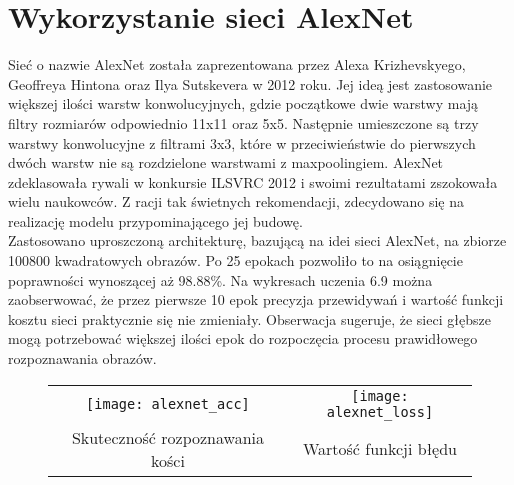 \section{Wykorzystanie sieci AlexNet}
Sieć o nazwie AlexNet \cite{AlexNetNVIDIA, AlexNetdesc, AlexNetpresentation} została
zaprezentowana przez Alexa Krizhevskyego, Geoffreya Hintona oraz Ilya Sutskevera w 2012 roku.
Jej ideą jest zastosowanie większej ilości warstw konwolucyjnych, gdzie początkowe dwie warstwy
mają filtry rozmiarów odpowiednio 11x11 oraz 5x5. Następnie umieszczone są trzy warstwy
konwolucyjne z filtrami 3x3, które w przeciwieństwie do pierwszych
dwóch warstw nie są rozdzielone warstwami z maxpoolingiem. AlexNet zdeklasowała rywali
w konkursie ILSVRC 2012 i swoimi rezultatami zszokowała wielu naukowców. Z racji tak świetnych
rekomendacji, zdecydowano się na realizację modelu przypominającego jej budowę.\\
Zastosowano uproszczoną architekturę, bazującą na idei sieci AlexNet, na zbiorze 100800 kwadratowych
obrazów. Po 25 epokach pozwoliło to na osiągnięcie poprawności wynoszącej aż 98.88\%.
Na wykresach uczenia 6.9 można zaobserwować, że przez pierwsze 10 epok precyzja przewidywań
i wartość funkcji kosztu sieci praktycznie się nie zmieniały. Obserwacja sugeruje, że sieci
głębsze mogą potrzebować większej ilości epok do rozpoczęcia procesu prawidłowego rozpoznawania obrazów.\\
\begin{figure}[h!]
\begin{center}
\begin{tabular}{cc}
\texttt{[image: alexnet\_acc]} &
\texttt{[image: alexnet\_loss]} \\
 Skuteczność rozpoznawania kości & Wartość funkcji błędu\\
\end{tabular}
\label{fig:alexnet_idea}
\end{center}
\end{figure}

